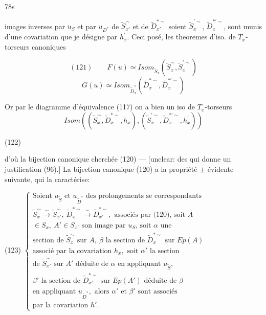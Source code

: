 \newpage


78s

images inverses par $u_S$ et par $u_{D^*}$ de $\tilde{S}_{x'}^\sim$ et de $\tilde{D}_{x'}^{* \sim}$
soient $\tilde{S}_x^{\prime \sim}$, $\tilde{D}_x^{* \prime \sim}$, sont munis d'une covariation
que je désigne par $h_x^\prime$. Ceci posé, les theoremes
d'iso. de $T_x$-torseurs canoniques

$$ (121) \qquad F(u) \simeq Isom_{\tilde{S}_x}(\tilde{S}_x^\sim, \tilde{S}_x^{\prime \sim}) $$
$$ G(u) \simeq Isom_{\tilde{D}_x^*}(\tilde{D}_x^{*\sim}, \tilde{D}_x^{* \prime \sim}) $$

Or par le diagramme d'équivalence (117) on
a bien un iso de $T_x$-torseurs
$$ Isom((\tilde{S}_x^\sim, \tilde{D}_x^{*\sim}, h_x), (\tilde{S}_x^{\prime \sim}, \tilde{D}_x^{* \prime \sim}, h_x^\prime)) $$

(122)

d'où la bijection canonique cherchée (120) —
[unclear: des qui donne un justification (96).]
La bijection canonique (120) a la
propriété $\pm$ évidente suivante, qui la caractérise:

(123) $\begin{cases}
\text{Soient } u_{\tilde{S}} \text{ et } u_{\tilde{D}^*} \text{ des prolongements se correspondants} \\
\tilde{S}_x^\sim \xrightarrow{\sim} \tilde{S}_{x'}^\sim, \ \tilde{D}_x^{*\sim} \xrightarrow{\sim} \tilde{D}_{x'}^{* \sim}, \text{ associés par (120), soit } A \\
\in S_x, \ A' \in S_{x'} \text{ son image par } u_S \text{, soit } \alpha \text{ une} \\
\text{section de } \tilde{S}_x^\sim \text{ sur } A, \ \beta \text{ la section de } \tilde{D}_x^{*\sim} \text{ sur } Ep(A) \\
\text{associé par la covariation } h_x, \text{ soit } \alpha' \text{ la section} \\
\text{de } \tilde{S}_{x'}^\sim \text{ sur } A' \text{ déduite de } \alpha \text{ en appliquant } u_{\tilde{S}}, \\
\beta' \text{ la section de } \tilde{D}_{x'}^{* \sim} \text{ sur } Ep(A') \text{ déduite de } \beta \\
\text{en appliquant } u_{\tilde{D}^*}, \text{ alors } \alpha' \text{ et } \beta' \text{ sont associés} \\
\text{par la covariation } h'.
\end{cases}$

